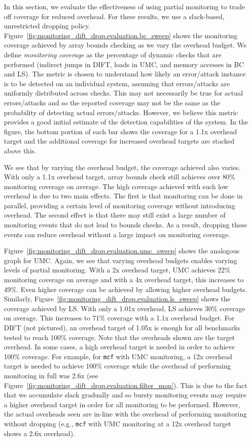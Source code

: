 In this section, we evaluate the effectiveness of using partial monitoring to
trade off coverage for reduced overhead.  For these results, we use a
slack-based, unrestricted dropping policy.
Figure~\ref{fig:monitoring_dift_drop.evaluation.bc_sweep} shows the monitoring
coverage achieved by array bounds checking as we vary the overhead budget.  We
define \emph{monitoring coverage} as the percentage of dynamic checks that are
performed (indirect jumps in DIFT, loads in UMC, and memory accesses in BC and
LS).  The metric is chosen to understand how likely an error/attack instance is
to be detected on an individual system, assuming that errors/attacks are
uniformly distributed across checks. This may not necessarily be true for
actual errors/attacks and so the reported coverage may not be the same as the
probability of detecting actual errors/attacks.  However, we believe this
metric provides a good initial estimate of the detection capabilities of the
system.  In the figure, the bottom portion of each bar shows the coverage for a
1.1x overhead target and the additional coverage for increased overhead targets
are stacked above this.

We see that by varying the overhead budget, the coverage achieved also varies.
With only a 1.1x overhead target, array bounds check still achieves over 80\%
monitoring coverage on average. The high coverage achieved with such low
overhead is due to two main effects.  The first is that monitoring can be done
in parallel, providing a certain level of monitoring coverage without
introducing overhead. The second effect is that there may still exist a large
number of monitoring events that do not lead to bounds checks. As a result,
dropping these events can reduce overhead without a large impact on monitoring
coverage.

Figure~\ref{fig:monitoring_dift_drop.evaluation.umc_sweep} shows the analogous
graph for UMC. Again, we see that varying overhead budgets enables varying levels of partial
monitoring.  With a 2x overhead target, UMC achieves 22\% monitoring coverage
on average and with a 4x overhead target, this increases to 49\%.  Even higher
coverage can be achieved by allowing higher overhead budgets.  Similarly,
Figure~\ref{fig:monitoring_dift_drop.evaluation.ls_sweep} shows the coverage
achieved by LS.  With only a 1.01x overhead, LS achieves 30\% coverage on
average. This increases to 71\% coverage with a 1.1x overhead budget.  For DIFT
(not pictured), an overhead target of 1.05x is enough for all benchmarks tested
to reach 100\% coverage.  Note that the overheads shown are the target
overhead. In some cases, a high overhead target is needed in order to achieve
100\% coverage. For example, for {\tt mcf} with UMC monitoring, a 12x overhead
target is needed to achieve 100\% coverage while the overhead of performing
monitoring in full was 2.6x (see
Figure~\ref{fig:monitoring_dift_drop.evaluation.filter_mon}). This is due to
the fact that we accumulate slack gradually and so bursty monitoring events may
require a higher overhead target in order for all monitoring to be performed.
However, the actual overheads seen are in-line with the overhead of performing
monitoring without dropping (e.g., {\tt mcf} with UMC monitoring at a 12x
overhead target shows a 2.6x overhead).

